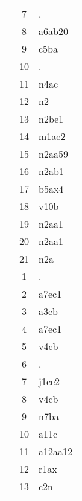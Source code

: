 \begin{table}[htbp]
\begin{tabular}{c c l}
	 & 7 & . \\
	 & 8 & a6ab20 \\
	 & 9 & c5ba \\
	 & 10 & . \\
	 & 11 & n4ac \\
	 & 12 & n2 \\
	 & 13 & n2be1 \\
	 & 14 & m1ae2 \\
	 & 15 & n2aa59 \\
	 & 16 & n2ab1 \\
	 & 17 & b5ax4 \\
	 & 18 & v10b \\
	 & 19 & n2aa1 \\
	 & 20 & n2aa1 \\
	 & 21 & n2a \\
	\addlinespace
	8 & 1 & . \\
	 & 2 & a7ec1 \\
	 & 3 & a3cb \\
	 & 4 & a7ec1 \\
	 & 5 & v4cb \\
	 & 6 & . \\
	 & 7 & j1ce2 \\
	 & 8 & v4cb \\
	 & 9 & n7ba \\
	 & 10 & a11c \\
	 & 11 & a12aa12 \\
	 & 12 & r1ax \\
	 & 13 & c2n \\
	\bottomrule
\end{tabular}
\end{table}


